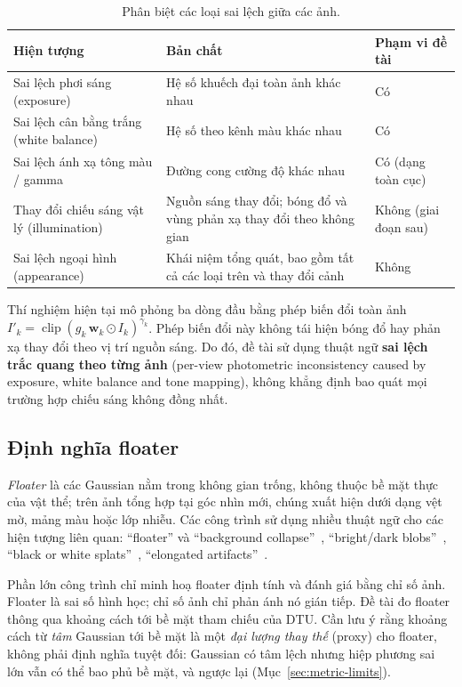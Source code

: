 \documentclass[11pt,a4paper]{article}
\begin{document}
\begin{table}[H]
\centering\small
\caption{Phân biệt các loại sai lệch giữa các ảnh.}
\label{tab:terms}
\begin{tabularx}{\textwidth}{@{}l Y l@{}}
\toprule
Hiện tượng & Bản chất & Phạm vi đề tài \\
\midrule
Sai lệch phơi sáng (exposure) & Hệ số khuếch đại toàn ảnh khác nhau & Có \\
Sai lệch cân bằng trắng (white balance) & Hệ số theo kênh màu khác nhau & Có \\
Sai lệch ánh xạ tông màu / gamma & Đường cong cường độ khác nhau & Có (dạng toàn cục) \\
Thay đổi chiếu sáng vật lý (illumination) & Nguồn sáng thay đổi; bóng đổ và vùng phản xạ thay đổi theo không gian & Không (giai đoạn sau) \\
Sai lệch ngoại hình (appearance) & Khái niệm tổng quát, bao gồm tất cả các loại trên và thay đổi cảnh & Không \\
\bottomrule
\end{tabularx}
\end{table}

Thí nghiệm hiện tại mô phỏng ba dòng đầu bằng phép biến đổi toàn ảnh $I'_k=\operatorname{clip}(g_k\,\mathbf{w}_k\odot I_k)^{\gamma_k}$. Phép biến đổi này không tái hiện bóng đổ hay phản xạ thay đổi theo vị trí nguồn sáng. Do đó, đề tài sử dụng thuật ngữ \textbf{sai lệch trắc quang theo từng ảnh} (per-view photometric inconsistency caused by exposure, white balance and tone mapping), không khẳng định bao quát mọi trường hợp chiếu sáng không đồng nhất.

\subsection{Định nghĩa floater}
\emph{Floater} là các Gaussian nằm trong không gian trống, không thuộc bề mặt thực của vật thể; trên ảnh tổng hợp tại góc nhìn mới, chúng xuất hiện dưới dạng vệt mờ, mảng màu hoặc lớp nhiễu. Các công trình sử dụng nhiều thuật ngữ cho các hiện tượng liên quan: ``floater'' và ``background collapse''~\cite{fnm,sparsegs}, ``bright/dark blobs''~\cite{vastgaussian}, ``black or white splats''~\cite{gaussiandk}, ``elongated artifacts''~\cite{sparsegsw}.

Phần lớn công trình chỉ minh hoạ floater định tính và đánh giá bằng chỉ số ảnh. Floater là sai số hình học; chỉ số ảnh chỉ phản ánh nó gián tiếp. Đề tài đo floater thông qua khoảng cách tới bề mặt tham chiếu của DTU. Cần lưu ý rằng khoảng cách từ \emph{tâm} Gaussian tới bề mặt là một \emph{đại lượng thay thế} (proxy) cho floater, không phải định nghĩa tuyệt đối: Gaussian có tâm lệch nhưng hiệp phương sai lớn vẫn có thể bao phủ bề mặt, và ngược lại (Mục~\ref{sec:metric-limits}).
\end{document}
